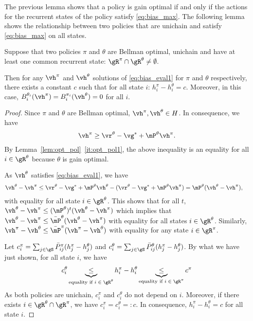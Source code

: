The previous lemma shows that a policy is gain optimal if and only if the actions for the recurrent states of the policy satisfy \eqref{eq:bias_max}.
The following lemma shows the relationship between two policies that are unichain and satisfy \eqref{eq:bias_max} on all states.

\begin{lem}
    \label{lem:equi_bias}
    Suppose that two policies $\pi$ and $\theta$ are Bellman optimal, unichain and have at least one common recurrent state: $\gR^\pi\cap\gR^\theta\neq\emptyset$.
    
    Then for any $\vh^\pi$ and $\vh^\theta$ solutions of \eqref{eq:bias_eval1} for $\pi$ and $\theta$ respectively, there exists a constant $c$ such that for all state $i$: $h^\pi_i -h^\theta_i =c$. Moreover, in this case, ${B_i^{\theta_i}(\vh^\pi)=B_i^{\pi_i}(\vh^\theta)=0}$ for all $i$.
\end{lem}
\begin{proof}
    Since $\pi$ and $\theta$ are Bellman optimal, $\vh^\pi,\vh^\theta\in H$.
    In consequence, we have
    \begin{align*}
        \vh^\pi \ge \vr^\theta -\vg^* +\mP^\theta\vh^\pi.
    \end{align*}
    By Lemma~\ref{lem:opt_pol}~\ref{it:opt_pol1}, the above inequality is an equality for all $i\in\gR^\theta$ because $\theta$ is gain optimal.

    As $\vh^\theta$ satisfies \eqref{eq:bias_eval1}, we have
    \begin{align*}
        \vh^\theta -\vh^\pi &\le \vr^\theta -\vg^* +\mP^\theta\vh^\theta -(\vr^\theta -\vg^* +\mP^\theta\vh^\pi) = \mP^\theta(\vh^\theta -\vh^\pi),
    \end{align*}
    with equality for all state $i\in\gR^\theta$. This shows that for all $t$, $\vh^\theta -\vh^\pi\le (\mP^\theta)^t(\vh^\theta -\vh^\pi)$ which implies that $\vh^\theta -\vh^\pi\le \bar{\mP}^\theta(\vh^\theta -\vh^\pi)$ with equality for all states $i\in\gR^\theta$. Similarly, $\vh^\pi -\vh^\theta \le \bar{\mP}^\pi(\vh^\pi -\vh^\theta)$ with equality for any state $i\in\gR^\pi$.

    Let $c^\pi_i=\sum_{j\in\gS}\bar{P}^\pi_{ij}(h_j^\pi-h_j^\theta)$ and $c^\theta_i=\sum_{j\in\gS}\bar{P}^\theta_{ij}(h_j^\pi-h_j^\theta)$. By what we have just shown, for all state $i$, we have
    \begin{align*}
        c^\theta_i \underbrace{\le}_{\text{equality if $i\in\gR^\theta$}} h_i^\pi-h_i^\theta \underbrace{\le}_{\text{equality if $i\in\gR^\pi$}} c^\pi
    \end{align*}
    As both policies are unichain, $c^\pi_i$ and $c^\theta_i$ do not depend on $i$.  Moreover, if there exists $i\in\gR^\theta\cap\gR^\pi$, we have $c^\pi_i=c^\theta_i =: c$. In consequence,  $h_i^\pi-h_i^\theta=c$ for all state $i$. 
\end{proof}


